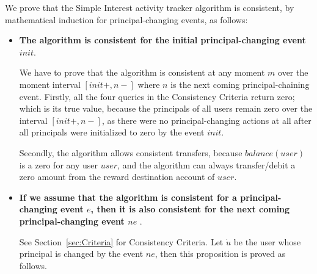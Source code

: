 \documentclass{article}
\begin{document}
We prove that the Simple Interest activity tracker algorithm is consistent, 
by mathematical induction for principal-changing events, as follows:

\begin{itemize}
  \item \textbf{The algorithm is consistent for the initial principal-changing 
  event $init$}.  

  We have to prove that the algorithm is consistent at any moment $m$ over 
  the moment interval $[init+, n-]$ where $n$ is the next coming principal-chaining 
  event.
  Firstly, all the four queries in the Consistency Criteria   
  return zero; which is its true value, because the principals of all users  
  remain zero over the interval $[init+, n-]$, as there were no 
  principal-changing actions at all after all principals were initialized 
  to zero by the event $init$.

  Secondly, the algorithm allows consistent transfers, because $balance(user)$ is a 
  zero for any user $user$, and the algorithm can always transfer/debit a zero amount 
  from the reward destination account of $user$.

  \item \textbf{If we assume that the algorithm is consistent for a principal-changing 
  event $e$, then it is also consistent for the next coming principal-changing event $ne$ }.

  See Section~\ref{sec:Criteria} for Consistency Criteria. 
  Let $\dot u$ be the user whose principal is changed by the event $ne$, 
  then this proposition is proved as follows.

  \begin{itemize}


\end{itemize}
\end{itemize}
\end{document}
